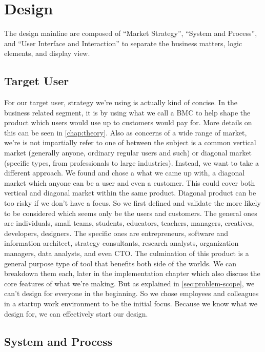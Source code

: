 \section{Design}
\label{sec:design}

The design mainline are composed of ``Market Strategy'', ``System and Process'', and ``User Interface and Interaction'' to separate the business matters, logic elements, and display view.

\subsection{Target User}

For our target user, strategy we're using is actually kind of concise. In the business related segment, it is by using what we call a \ac{BMC} to help shape the product which users would use up to customers would pay for. More details on this can be seen in \autoref{chap:theory}.
Also as concerns of a wide range of market, we're is not impartially refer to one of between the subject is a common vertical market (generally anyone, ordinary regular users and such) or diagonal market (specific types, from professionals to large industries).
Instead, we want to take a different approach.
We found and chose a what we came up with, a diagonal market which anyone can be a user and even a customer.
This could cover both vertical and diagonal market within the same product.
Diagonal product can be too risky if we don't have a focus.
So we first defined and validate the more likely to be considered which seems only be the users and customers.
The general ones are individuals, small teams, students, educators, teachers, managers, creatives, developers, designers. The specific ones are entrepreneurs, software and information architect, strategy consultants, research analysts, organization managers, data analysts, and even \ac{CTO}.
The culmination of this product is a general purpose type of tool that benefits both side of the worlds.
We can breakdown them each, later in the implementation chapter which also discuss the core features of what we're making.
But as explained in \autoref{sec:problem-scope}, we can't design for everyone in the beginning.
So we chose employees and colleagues in a startup work environment to be the initial focus.
Because we know what we design for, we can effectively start our design.

\subsection{System and Process}

